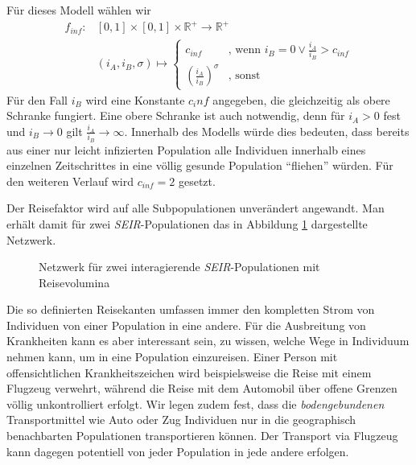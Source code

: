 Für dieses Modell wählen wir
\begin{align}
	f_{inf} :& [0,1]\times [0,1] \times \mathbb{R}^+ \rightarrow  \mathbb{R}^+\\
			 & (i_A,i_B,\sigma)\longmapsto								\begin{cases}c_{inf}&\text{, wenn } i_B = 0 \vee \frac{i_A}{i_B} > c_{inf} \\\left( \frac{i_A}{i_B}\right)^\sigma &\text{, sonst}\end{cases}\nonumber			  
\end{align}
Für den Fall $i_B$ wird eine Konstante $c_inf$ angegeben, die gleichzeitig als obere Schranke fungiert. Eine obere Schranke ist auch notwendig, denn für $i_A >0$ fest und $i_B\rightarrow 0$ gilt $\frac{i_A}{i_B}\rightarrow \infty$. Innerhalb des Modells würde dies bedeuten, dass bereits aus einer nur leicht infizierten Population alle Individuen innerhalb eines einzelnen Zeitschrittes in eine völlig gesunde Population ``fliehen'' würden. Für den weiteren Verlauf wird $c_{inf} = 2$ gesetzt. 

Der Reisefaktor wird auf alle Subpopulationen unverändert angewandt. Man erhält damit für zwei \emph{SEIR}-Populationen das in Abbildung \ref{fig:ssec:multiPop:travelSEIR} dargestellte Netzwerk.
\begin{figure}
\begin{center}
\end{center}
\caption{Netzwerk für zwei interagierende \emph{SEIR}-Populationen mit Reisevolumina}\label{fig:ssec:multiPop:travelSEIR}
\end{figure}
Die so definierten Reisekanten umfassen immer den kompletten Strom von Individuen von einer Population in eine andere. Für die Ausbreitung von Krankheiten kann es aber interessant sein, zu wissen, welche Wege in Individuum nehmen kann, um in eine Population einzureisen. Einer Person mit offensichtlichen Krankheitszeichen wird beispielsweise die Reise mit einem Flugzeug verwehrt, während die Reise mit dem Automobil über offene Grenzen völlig unkontrolliert erfolgt. Wir legen zudem fest, dass die \emph{bodengebundenen} Transportmittel wie Auto oder Zug Individuen nur in die geographisch benachbarten Populationen transportieren können. Der Transport via Flugzeug kann dagegen potentiell von jeder Population in jede andere erfolgen. 

